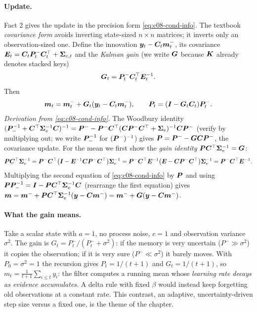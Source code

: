 \paragraph{Update.} Fact 2 gives the update in the precision form \eqref{eq:c08-cond-info}. The
textbook \emph{covariance form} avoids inverting state-sized $n\times n$ matrices; it inverts only
an observation-sized one. Define the innovation
$\bm{y}_t-\bm{C}_t\bm{m}_t^-$, its covariance $\bm{E}_t=\bm{C}_t\bm{P}_t^-\bm{C}_t^{\top}+\bm{\Sigma}_{e,t}$ and the
\emph{Kalman gain} (we write $\bm{G}$ because $\bm{K}$ already denotes stacked keys)
\begin{equation}\label{eq:c08-gain}
  \bm{G}_t = \bm{P}_t^-\bm{C}_t^{\top}\bm{E}_t^{-1}.
\end{equation}
Then
\begin{equation}\label{eq:c08-kf-update}
  \bm{m}_t = \bm{m}_t^- + \bm{G}_t(\bm{y}_t-\bm{C}_t\bm{m}_t^-), \qquad \bm{P}_t = (\bm{I}-\bm{G}_t\bm{C}_t)\bm{P}_t^- .
\end{equation}
\emph{Derivation from \eqref{eq:c08-cond-info}.} The Woodbury identity
$(\bm{P}_-^{-1}+\bm{C}^{\top}\bm{\Sigma}_e^{-1}\bm{C})^{-1}=\bm{P}^- -\bm{P}^-\bm{C}^{\top}(\bm{C}\bm{P}^-\bm{C}^{\top}+\bm{\Sigma}_e)^{-1}\bm{C}\bm{P}^-$
(verify by multiplying out; we write $\bm{P}_-^{-1}$ for $(\bm{P}^-)^{-1}$) gives $\bm{P}=\bm{P}^- - \bm{G}\bm{C}\bm{P}^-$, the covariance update. For the mean
we first show the \emph{gain identity} $\bm{P}\bm{C}^{\top}\bm{\Sigma}_e^{-1}=\bm{G}$:
\[
  \bm{P}\bm{C}^{\top}\bm{\Sigma}_e^{-1}
  = \bm{P}^-\bm{C}^{\top}\bigl(\bm{I}-\bm{E}^{-1}\bm{C}\bm{P}^-\bm{C}^{\top}\bigr)\bm{\Sigma}_e^{-1}
  = \bm{P}^-\bm{C}^{\top}\bm{E}^{-1}\bigl(\bm{E}-\bm{C}\bm{P}^-\bm{C}^{\top}\bigr)\bm{\Sigma}_e^{-1}
  = \bm{P}^-\bm{C}^{\top}\bm{E}^{-1} .
\]
Multiplying the second equation of \eqref{eq:c08-cond-info} by $\bm{P}$ and using
$\bm{P}\bm{P}_-^{-1}=\bm{I}-\bm{P}\bm{C}^{\top}\bm{\Sigma}_e^{-1}\bm{C}$ (rearrange the first equation) gives
$\bm{m}=\bm{m}^-+\bm{P}\bm{C}^{\top}\bm{\Sigma}_e^{-1}(\bm{y}-\bm{C}\bm{m}^-)=\bm{m}^-+\bm{G}(\bm{y}-\bm{C}\bm{m}^-)$.

\paragraph{What the gain means.} Take a scalar state with $a=1$, no process noise, $c=1$ and
observation variance $\sigma^2$. The gain is $G_t=P_t^-/(P_t^-+\sigma^2)$: if the memory is very
uncertain ($P^-\gg\sigma^2$) it copies the observation; if it is very sure ($P^-\ll\sigma^2$) it
barely moves. With $P_0=\sigma^2=1$ the recursion gives $P_t=1/(t+1)$ and $G_t=1/(t+1)$, so
$m_t=\frac{1}{t+1}\sum_{i\le t}y_i$: the filter computes a running mean whose \emph{learning rate
decays as evidence accumulates}. A delta rule with fixed $\beta$ would instead keep forgetting old
observations at a constant rate. This contrast, an adaptive, uncertainty-driven step size versus a
fixed one, is the theme of the chapter.

